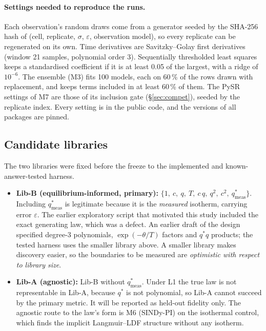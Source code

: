 \documentclass[11pt]{article}
\newcommand{\qs}{q^{*}}
\newcommand{\qsm}{q^{*}_{\mathrm{meas}}}
\begin{document}
\paragraph{Settings needed to reproduce the runs.} Each observation's random draws come from
a generator seeded by the SHA-256 hash of (cell, replicate, $\sigma$, $\varepsilon$,
observation model), so every replicate can be regenerated on its own. Time derivatives are
Savitzky--Golay first derivatives (window 21 samples, polynomial order 3). Sequentially
thresholded least squares keeps a standardised coefficient if it is at least 0.05 of the
largest, with a ridge of $10^{-6}$. The ensemble (M3) fits 100 models, each on 60\,\% of the
rows drawn with replacement, and keeps terms included in at least 60\,\% of them. The PySR settings of M7 are
those of its inclusion gate (\S\ref{sec:compet}), seeded by the replicate index. Every
setting is in the public code, and the versions of all packages are pinned.

\subsection{Candidate libraries}
\label{sec:libs}
The two libraries were fixed before the freeze to the implemented and
known-answer-tested harness.
\begin{itemize}
\item \textbf{Lib-B (equilibrium-informed, primary):} $\{1,\ c,\ q,\ T,\ c\,q,\ q^{2},\
c^{2},\ \qsm\}$. Including $\qsm$ is legitimate because it is the \emph{measured} isotherm,
carrying error $\varepsilon$. The earlier exploratory script that motivated this study
included the exact generating law, which was a defect. An earlier draft of the design
specified degree-3 polynomials, $\exp(-\theta/T)$ factors and $\qs q$ products; the tested
harness uses the smaller library above. A smaller library makes discovery easier, so the
boundaries to be measured are \emph{optimistic with respect to library size}.
\item \textbf{Lib-A (agnostic):} Lib-B without $\qsm$. Under L1 the true law is not
representable in Lib-A, because $\qs$ is not polynomial, so Lib-A cannot succeed by the
primary metric. It will be reported as held-out fidelity only. The agnostic route to the
law's form is M6 (SINDy-PI) on the isothermal control, which finds the implicit
Langmuir--LDF structure without any isotherm.
\end{itemize}
\end{document}
